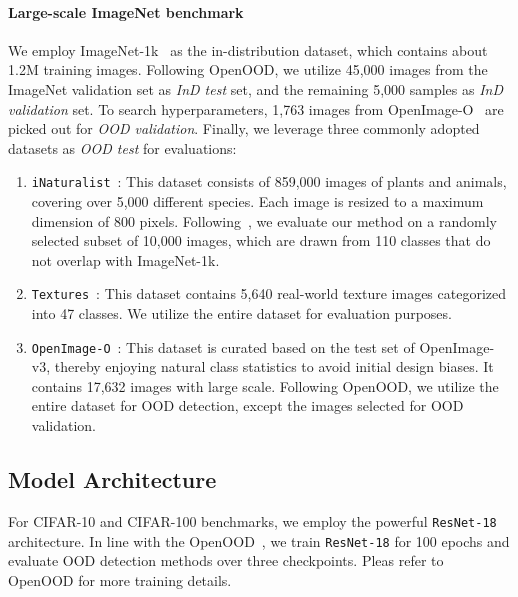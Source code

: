 \documentclass{article} \usepackage{iclr2024_conference,times}
\begin{document}
\paragraph{Large-scale ImageNet benchmark} 
We employ ImageNet-1k~\citep{Setup:ImageNet} as the in-distribution dataset, which contains about 1.2M training images. 
Following OpenOOD, we utilize 45,000 images from the ImageNet validation set as \textit{InD test} set, and the remaining 5,000 samples as \textit{InD validation} set. 
To search hyperparameters, 1,763 images from OpenImage-O~\citep{OOD_Detect:ViM} are picked out for
\textit{OOD validation}.
Finally, we leverage three commonly adopted datasets as \textit{OOD test} for evaluations:
\begin{enumerate}
	\item \texttt{iNaturalist}~\citep{OOD_Dataset:iNaturalist}: This dataset consists of 859,000 images of plants and animals, covering over 5,000 different species. Each image is resized to a maximum dimension of 800 pixels. Following~\citep{OOD_Detect:MOS,Setup:OpenOOD}, we evaluate our method on a randomly selected subset of 10,000 images, which are drawn from 110 classes that do not overlap with ImageNet-1k.

	\item \texttt{Textures}~\citep{OOD_Dataset:Textures}: This dataset contains 5,640 real-world texture images categorized into 47 classes. We utilize the entire dataset for evaluation purposes.

	\item \texttt{OpenImage-O}~\citep{OOD_Detect:ViM}: This dataset is curated based on the test set of OpenImage-v3, thereby enjoying natural class statistics to avoid initial design biases. It contains 17,632 images with large scale. Following OpenOOD, we utilize the entire dataset for OOD detection, except the images selected for OOD validation.
	







\end{enumerate}








\subsection{Model Architecture}
\label{Appendix:OOD_Detection:Model}

For CIFAR-10 and CIFAR-100 benchmarks, we employ the powerful \texttt{ResNet-18}~\citep{tech:ResNet} architecture. In line with the OpenOOD~\citep{Setup:OpenOOD,Setup:OpenOODv1.5}, we train \texttt{ResNet-18} for 100 epochs and evaluate OOD detection methods over three checkpoints. Pleas refer to OpenOOD for more training details.
\end{document}
